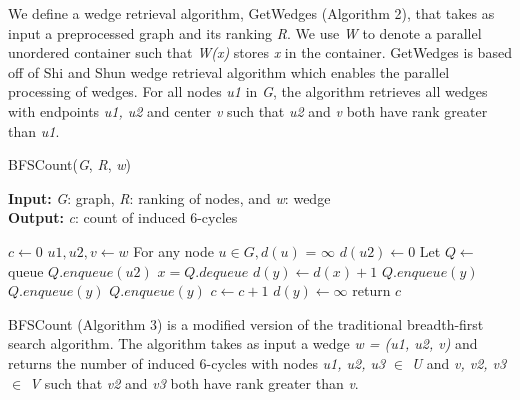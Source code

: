 \documentclass[11pt]{article}
\begin{document}
We define a wedge retrieval algorithm, GetWedges (Algorithm 2), that takes as input a preprocessed graph and its ranking \textit{R}.
We use \textit{W} to denote a parallel unordered container such that \textit{W(x)} stores \textit{x} in the container.
GetWedges is based off of Shi and Shun \cite{shi2019parallel} wedge retrieval algorithm which enables the parallel processing of wedges.
For all nodes \textit{u1} in \textit{G}, the algorithm retrieves all wedges with endpoints \textit{u1, u2} and center \textit{v} such that \textit{u2} and \textit{v} both have rank greater than \textit{u1}.

\begin{algorithm}[H]
\caption{BFSCount(\textit{G}, \textit{R}, \textit{w})}
\hspace*{\algorithmicindent} \textbf{Input:} \textit{G}: graph, \textit{R}: ranking of nodes, and \textit{w}: wedge \\
\hspace*{\algorithmicindent} \textbf{Output:} \textit{c}: count of induced 6-cycles
\begin{algorithmic}[1]
    \State $c \gets 0$
    \State $u1, u2, v \gets w$
    \State For any node $u \in G, d(u)$ = $\infty$
    \State $d(u2) \gets 0$
    \State Let $Q \gets$ queue
    \State $Q.enqueue(u2)$
        \State $x = Q.dequeue$
                \State $d(y) \gets d(x) + 1$
                        \State $Q.enqueue(y)$
                    \EndIf
                        \State $Q.enqueue(y)$
                    \EndIf
                        \State $Q.enqueue(y)$
                    \EndIf
                \Else
                        \State $c \gets c + 1$
                        \State $d(y) \gets \infty$
                    \EndIf
                \EndIf
            \EndIf
        \EndFor
    \EndWhile
    \State return $c$
\end{algorithmic}
\end{algorithm}

BFSCount (Algorithm 3) is a modified version of the traditional breadth-first search algorithm.
The algorithm takes as input a wedge \textit{w = (u1, u2, v)} and returns the number of induced 6-cycles with nodes \textit{u1, u2, u3} $\in$ \textit{U} and \textit{v, v2, v3} $\in$ \textit{V} such that \textit{v2} and \textit{v3} both have rank greater than \textit{v}.
\end{document}
